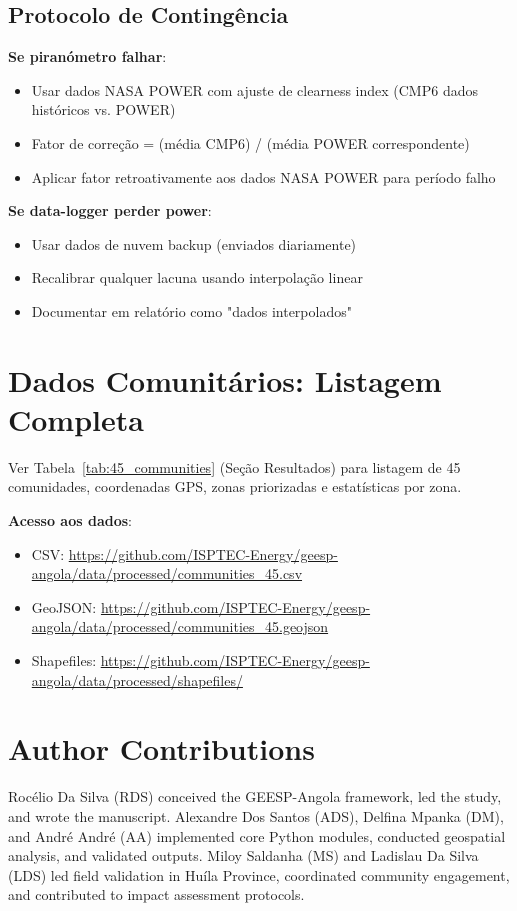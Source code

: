 \documentclass[12pt, a4paper]{article}
\begin{document}
\subsection{Protocolo de Contingência}

\textbf{Se piranómetro falhar}:
\begin{itemize}
\item Usar dados NASA POWER com ajuste de clearness index (CMP6 dados históricos vs. POWER)
\item Fator de correção = (média CMP6) / (média POWER correspondente)
\item Aplicar fator retroativamente aos dados NASA POWER para período falho
\end{itemize}

\textbf{Se data-logger perder power}:
\begin{itemize}
\item Usar dados de nuvem backup (enviados diariamente)
\item Recalibrar qualquer lacuna usando interpolação linear
\item Documentar em relatório como "dados interpolados"
\end{itemize}

\section{Dados Comunitários: Listagem Completa}
\label{app:community_data}

Ver Tabela~\ref{tab:45_communities} (Seção Resultados) para listagem de 45 comunidades, coordenadas GPS, zonas priorizadas e estatísticas por zona.

\textbf{Acesso aos dados}:
\begin{itemize}
\item CSV: \url{https://github.com/ISPTEC-Energy/geesp-angola/data/processed/communities_45.csv}
\item GeoJSON: \url{https://github.com/ISPTEC-Energy/geesp-angola/data/processed/communities_45.geojson}
\item Shapefiles: \url{https://github.com/ISPTEC-Energy/geesp-angola/data/processed/shapefiles/}
\end{itemize}

\section*{Author Contributions}
Rocélio Da Silva (RDS) conceived the GEESP-Angola framework, led the study, and wrote the manuscript. Alexandre Dos Santos (ADS), Delfina Mpanka (DM), and André André (AA) implemented core Python modules, conducted geospatial analysis, and validated outputs. Miloy Saldanha (MS) and Ladislau Da Silva (LDS) led field validation in Huíla Province, coordinated community engagement, and contributed to impact assessment protocols.
\end{document}
